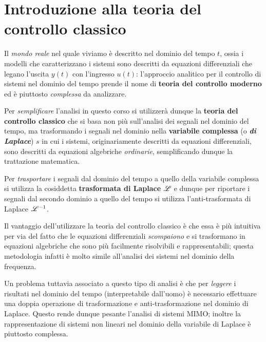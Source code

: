 \chapter{Introduzione alla teoria del controllo classico}
	Il \textit{mondo reale} nel quale viviamo è descritto nel dominio del tempo $t$, ossia i modelli che caratterizzano i sistemi sono descritti da equazioni differenziali che legano l'uscita $y(t)$ con l'ingresso $u(t)$: l'approccio analitico per il controllo di sistemi nel dominio del tempo prende il nome di \textbf{teoria del controllo moderno} ed è piuttosto \textit{complessa} da analizzare.
	
	\begin{concetto}
		Per \textit{semplificare} l'analisi in questo corso si utilizzerà dunque la \textbf{teoria del controllo classico} che si basa non più sull'analisi dei segnali nel dominio del tempo, ma trasformando i segnali nel dominio nella \textbf{variabile complessa} (o \textbf{\textit{di Laplace}}) $s$ in cui i sistemi, originariamente descritti da equazioni differenziali, sono descritti da equazioni algebriche \textit{ordinarie}, semplificando dunque la trattazione matematica.
		
		Per \textit{trasportare} i segnali dal dominio del tempo a quello della variabile complessa si utilizza la cosiddetta \textbf{trasformata di Laplace} $\mathscr L$ e dunque per riportare i segnali dal secondo dominio a quello del tempo si utilizza l'anti-trasformata di Laplace $\mathscr {L}^{-1}$.
	\end{concetto} 

	Il vantaggio dell'utilizzare la teoria del controllo classico è che essa è più intuitiva per via del fatto che le equazioni differenziali \textit{scompaiono} e si trasformano in equazioni algebriche che sono più facilmente risolvibili e rappresentabili; questa metodologia infatti è molto simile all'analisi dei sistemi nel dominio della frequenza.
	
	Un problema tuttavia associato a questo tipo di analisi  è che per \textit{leggere} i risultati nel dominio del tempo (interpretabile dall'uomo) è necessario effettuare una doppia operazione di trasformazione e anti-trasformazione nel dominio di Laplace. Questo rende dunque pesante l'analisi di sistemi MIMO; inoltre la rappresentazione di sistemi non lineari nel dominio della variabile di Laplace è piuttosto complessa.

